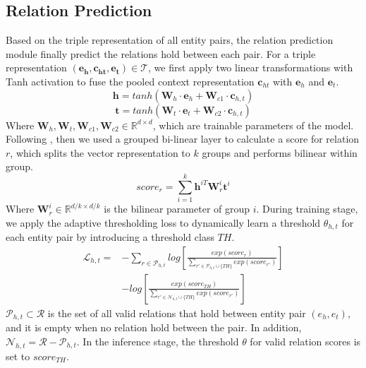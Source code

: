 \documentclass[11pt]{article}
\begin{document}
\subsection{Relation Prediction}
    Based on the triple representation of all entity pairs, the relation prediction module finally predict the relations hold between each pair. For a triple representation $\mathbf{(e_h,c_{ht},e_t) \in \mathcal{T}}$, we first apply two linear transformations with Tanh activation to fuse the pooled context representation $\mathbf{c}_{ht}$ with $\mathbf{e}_h$ and $\mathbf{e}_t$.
    \begin{equation}
        \label{eq:h_fusing}
        \mathbf{h} = tanh(\mathbf{W}_h \cdot \mathbf{e}_h + \mathbf{W}_{c1} \cdot \mathbf{c}_{h,t})
    \end{equation}
    \begin{equation}
        \label{eq:t_fusing}
        \mathbf{t} = tanh(\mathbf{W}_t \cdot \mathbf{e}_t + \mathbf{W}_{c2} \cdot \mathbf{c}_{h,t})
    \end{equation}
    Where $\mathbf{W}_{h},\mathbf{W}_{t},\mathbf{W}_{c1},\mathbf{W}_{c2} \in \mathbb{R}^{d\times d}$, which are trainable parameters of the model. Following \citet{zhou_atlop_2021}, then we used a grouped bi-linear layer to calculate a score for relation $r$, which splits the vector representation to $k$ groups and performs bilinear within group.
    \begin{equation}
        score_{r} = \sum_{i=1}^{k} \mathbf{h}^{iT}  \mathbf{W}_r^i \mathbf{t}^i
    \end{equation}
    Where $\mathbf{W}_r^i \in \mathbb{R}^{d/k \times d/k}$ is the bilinear parameter of group $i$. During training stage, we apply the adaptive thresholding loss \citep{zhou_atlop_2021} to dynamically learn a threshold $\theta_{h,t}$ for each entity pair by introducing a threshold class $TH$.
    \begin{equation}
        \label{eq:atlop-loss}
        \begin{aligned}
            \mathcal{L}_{h,t} = & -\sum _{r\in \mathcal{P}_{h,t}} log \left[ \frac{exp(score_r)}{\sum _{r' \in \mathcal{P}_{h,t} \cup \{TH\}} exp(score_{r'}) }\right]\\
                                & - log \left[ \frac{exp(score_{TH})}{\sum _{r' \in \mathcal{N}_{h,t} \cup \{TH\}} exp(score_{r'})}\right]
        \end{aligned}
    \end{equation}
    $\mathcal{P}_{h,t} \subset \mathcal{R}$ is the set of all valid relations that hold between entity pair $(e_h,e_t)$, and it is empty when no relation hold between the pair. In addition, $\mathcal{N}_{h,t} = \mathcal{R} - \mathcal{P}_{h,t}$. In the inference stage, the threshold $\theta$ for valid relation scores is set to $score_{TH}$.
   
\end{document}
